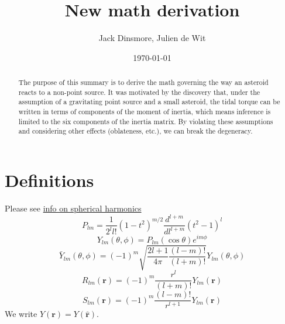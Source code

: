 \documentclass[aps,twocolumn,secnumarabic,balancelastpage,amsmath,amssymb,nofootinbib,floatfix]{revtex4-1}
\begin{document}
\title{New math derivation}
\author{Jack Dinsmore, Julien de Wit}
\date{\today}

\newcommand{\abs}[1]{\left| #1 \right|}
\newcommand{\parens}[1]{\left( #1 \right)}
\newcommand{\brackets}[1]{\left[ #1 \right]}
\newcommand{\comment}[1]{\textcolor{red}{\emph{ #1 }}}
\newcommand{\x}{\bm{\hat x}}
\newcommand{\y}{\bm{\hat y}}
\newcommand{\z}{\bm{\hat z}}
\newcommand{\J}{\mathcal{J}}
\newcommand{\K}{\mathcal{K}}
\newcommand{\R}{\mathcal{R}}





\begin{abstract}
    The purpose of this summary is to derive the math governing the way an asteroid reacts to a non-point source. It was motivated by the discovery that, under the assumption of a gravitating point source and a small asteroid, the tidal torque can be written in terms of components of the moment of inertia, which means inference is limited to the six components of the inertia matrix. By violating these assumptions and considering other effects (oblateness, etc.), we can break the degeneracy.
\end{abstract}

\maketitle



\section{Definitions}
Please see \href{https://citeseerx.ist.psu.edu/viewdoc/download?doi=10.1.1.56.5257&rep=rep1&type=pdf}{info on spherical harmonics}
$$P_{lm}=\frac{1}{2^ll!}(1-t^2)^{m/2} \frac{d^{l+m}}{dl^{l+m}}(t^2-1)^l$$
$$Y_{lm}(\theta, \phi) = P_{lm}(\cos\theta)e^{im\phi}$$
$$\bar Y_{lm}(\theta, \phi) = (-1)^m \sqrt{\frac{2l+1}{4\pi}\frac{(l-m)!}{(l+m)!}} Y_{lm}(\theta, \phi)$$
$$R_{lm}(\bm r) = (-1)^m \frac{r^l}{(l+m)!}Y_{lm}(\bm r)$$
$$S_{lm}(\bm r) = (-1)^m \frac{(l-m)!}{r^{l+1}}Y_{lm}(\bm r)$$
We write $Y(\bm r)=Y(\hat{\bm r})$.
\end{document}
